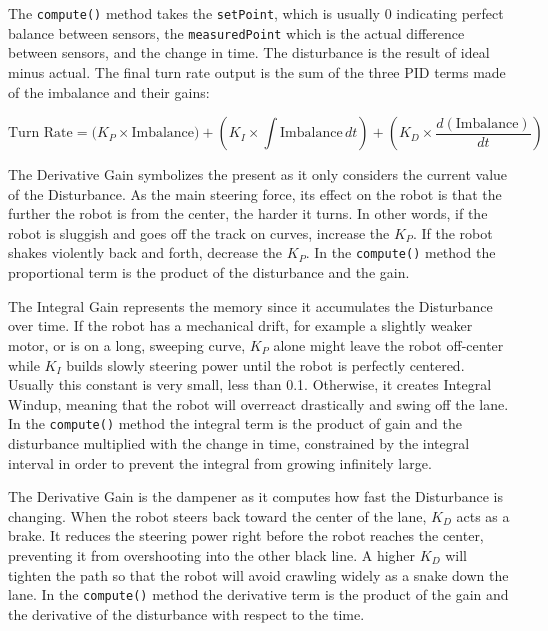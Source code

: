 The \texttt{compute()} method takes the \texttt{setPoint}, which is usually 0 indicating perfect balance between sensors, the \texttt{measuredPoint} which is the actual difference between sensors, and the change in time. The disturbance is the result of ideal minus actual. The final turn rate output is the sum of the three PID terms made of the imbalance and their gains:

\begin{equation}
    \text{Turn Rate} = \bigl(K_P \times \text{Imbalance}\bigr)
    + \left(K_I \times \int \text{Imbalance}\, dt\right)
    + \left(K_D \times \frac{d(\text{Imbalance})}{dt}\right)
\end{equation}

The Derivative Gain symbolizes the present as it only considers the current value of the Disturbance. As the main steering force, its effect on the robot is that the further the robot is from the center, the harder it turns. In other words, if the robot is sluggish and goes off the track on curves, increase the $K_P$. If the robot shakes violently back and forth, decrease the $K_P$. In the \texttt{compute()} method the proportional term is the product of the disturbance and the gain.

The Integral Gain represents the memory since it accumulates the Disturbance over time. If the robot has a mechanical drift, for example a slightly weaker motor, or is on a long, sweeping curve, $K_P$ alone might leave the robot off-center while $K_I$ builds slowly steering power until the robot is perfectly centered. Usually this constant is very small, less than 0.1. Otherwise, it creates Integral Windup, meaning that the robot will overreact drastically and swing off the lane. In the \texttt{compute()} method the integral term is the product of gain and the disturbance multiplied with the change in time, constrained by the integral interval in order to prevent the integral from growing infinitely large.

The Derivative Gain is the dampener as it computes how fast the Disturbance is changing. When the robot steers back toward the center of the lane, $K_D$ acts as a brake. It reduces the steering power right before the robot reaches the center, preventing it from overshooting into the other black line. A higher $K_D$ will tighten the path so that the robot will avoid crawling widely as a snake down the lane. In the \texttt{compute()} method the derivative term is the product of the gain and the derivative of the disturbance with respect to the time.

